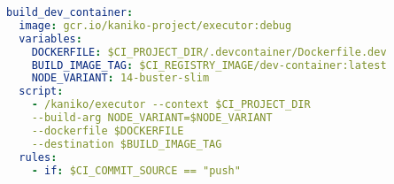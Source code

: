 
\begin{lstlisting}[language=yml,caption={GitLab \ac{CI} Build-File for Docker Images},breaklines=true,label={code::ci_build_yml}]
build_dev_container:
  image: gcr.io/kaniko-project/executor:debug
  variables:
    DOCKERFILE: $CI_PROJECT_DIR/.devcontainer/Dockerfile.dev
    BUILD_IMAGE_TAG: $CI_REGISTRY_IMAGE/dev-container:latest
    NODE_VARIANT: 14-buster-slim
  script:
    - /kaniko/executor --context $CI_PROJECT_DIR
    --build-arg NODE_VARIANT=$NODE_VARIANT
    --dockerfile $DOCKERFILE
    --destination $BUILD_IMAGE_TAG
  rules:
    - if: $CI_COMMIT_SOURCE == "push"

\end{lstlisting}
